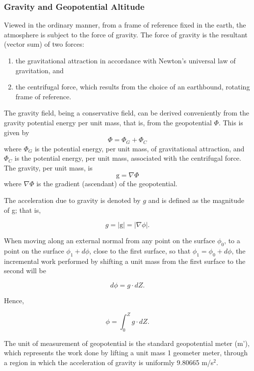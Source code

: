 \documentclass{article}
\begin{document}
\subsubsection{Gravity and Geopotential Altitude}

Viewed in the ordinary manner, from a frame of reference fixed in the earth, the atmosphere is subject to the force of gravity. The force of gravity is the resultant (vector sum) of two forces:
\begin{enumerate}
    \item the gravitational attraction in accordance with Newton's universal law of gravitation, and
    \item the centrifugal force, which results from the choice of an earthbound, rotating frame of reference.
\end{enumerate}

The gravity field, being a conservative field, can be derived conveniently from the gravity potential energy per unit mass, that is, from the geopotential $\Phi$. This is given by
\[
\Phi = \Phi_G + \Phi_C \tag{10}
\]
where $\Phi_G$ is the potential energy, per unit mass, of gravitational attraction, and $\Phi_C$ is the potential energy, per unit mass, associated with the centrifugal force. The gravity, per unit mass, is
\[
 \text{g} = \nabla \Phi \tag{11}
\]
where $\nabla \Phi$ is the gradient (ascendant) of the geopotential.

The acceleration due to gravity is denoted by $g$ and is defined as the magnitude of g; that is,

\begin{equation}
 g = |\text{g}| = |\nabla \phi|. \tag{12}
\end{equation}

When moving along an external normal from any point on the surface $\phi_0$, to a point on the surface $\phi_1+d\phi$, close to the first surface, so that $\phi_1 = \phi_0 + d\phi$, the incremental work performed by shifting a unit mass from the first surface to the second will be

\begin{equation}
 d\phi = g \cdot dZ. \tag{13}
\end{equation}

Hence,

\begin{equation}
 \phi = \int_{0}^{Z} g \cdot dZ . \tag{14}
\end{equation}

The unit of measurement of geopotential is the standard geopotential meter (m'), which represents the work done by lifting a unit mass 1 geometer meter, through a region in which the acceleration of gravity is uniformly 9.80665 m/s$^2$. \\
\end{document}
